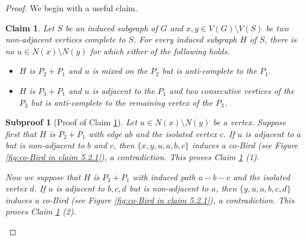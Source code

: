 \documentclass[10pt,a4paper]{amsart}
\newtheorem{claim}{Claim}
\newtheorem{subproof}{Subproof}
\begin{document}
    \begin{proof}
        We begin with a useful claim. 
        \begin{claim}\label{clm:a vertex mixed on a path via bird}
            Let $S$ be an induced subgraph of $G$ and $x,y\in V(G)\setminus V(S)$ be two non-adjacent vertices complete to $S$. 
            For every induced subgraph $H$ of $S$, there is no $u\in N(x)\setminus N(y)$ for which either of the following holds. 
            \begin{itemize}
                \item[$(1)$] $H$ is $P_2+P_1$ and $u$ is mixed on the $P_2$ but is anti-complete to the $P_1$.  
                \item[$(2)$] $H$ is $P_3+P_1$ and $u$ is adjacent to the $P_1$ and two consecutive vertices of the $P_3$ but is anti-complete to the remaining vertex of the $P_3$.  
            \end{itemize} 
        \end{claim}
        
        \begin{subproof}[Proof of Claim \ref{clm:a vertex mixed on a path via bird}]
            Let $u\in N(x)\setminus N(y)$ be a vertex. 
            Suppose first that $H$ is $P_2+P_1$ with edge $ab$ and the isolated vertex $c$. 
            If $u$ is adjacent to $a$ but is non-adjacent to $b$ and $c$, then $\{x,y,u,a,b,c\}$ induces a co-Bird (see Figure \ref{fig:co-Bird in claim 5.2.1}), a contradiction. 
            This proves Claim \ref{clm:a vertex mixed on a path via bird} (1). 

            Now we suppose that $H$ is $P_3+P_1$ with induced path $a-b-c$ and the isolated vertex $d$. 
            If $u$ is adjacent to $b,c,d$ but is non-adjacent to $a$, then $\{y,u,a,b,c,d\}$ induces a co-Bird (see Figure \ref{fig:co-Bird in claim 5.2.1}), a contradiction. 
            This proves Claim \ref{clm:a vertex mixed on a path via bird} (2). 
        \end{subproof}
        
        \begin{figure}[h!]
        \centering
\end{figure}
\end{proof}
\end{document}
